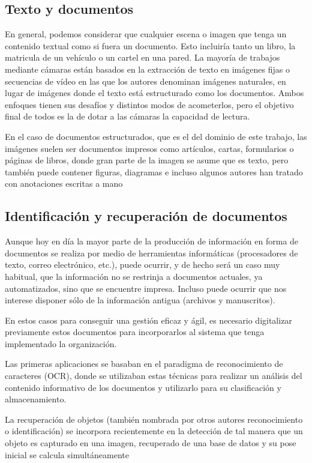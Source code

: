 \subsection{Texto y documentos}
En general, podemos considerar que cualquier escena o imagen que tenga un contenido textual como si fuera un documento. Esto incluiría tanto un libro, la matricula de un vehículo o un cartel en una pared. La mayoría de trabajos mediante cámaras están basados en la extracción de texto en imágenes fijas o secuencias de vídeo en las que los autores denominan imágenes naturales, en lugar de imágenes donde el texto está estructurado como los documentos. Ambos enfoques tienen sus desafíos y distintos modos de acometerlos, pero el objetivo final de todos es la de dotar a las cámaras la capacidad de lectura.

En el caso de documentos estructurados, que es el del dominio de este trabajo, las imágenes suelen ser documentos impresos como artículos, cartas, formularios o páginas de libros, donde gran parte de la imagen se asume que es texto, pero también puede contener figuras, diagramas e incluso algunos autores han tratado con anotaciones escritas a mano \cite{Chen}

\subsection{Identificación y recuperación de documentos}
Aunque hoy en día la mayor parte de la producción de información en forma de documentos se realiza por medio de herramientas informáticas (procesadores de texto, correo electrónico, etc.), puede ocurrir, y de hecho será un caso muy habitual, que la información no se restrinja a documentos actuales, ya automatizados, sino que se encuentre impresa. Incluso puede ocurrir que nos interese disponer sólo de la información antigua (archivos y manuscritos).

En estos casos para conseguir una gestión eficaz y ágil, es necesario digitalizar previamente estos documentos para incorporarlos al sistema que tenga implementado la organización.

Las primeras aplicaciones se basaban en el paradigma de reconocimiento de caracteres (OCR), donde se utilizaban estas técnicas para realizar un análisis del contenido informativo de los documentos y utilizarlo para su clasificación y almacenamiento. 

La recuperación de objetos (también nombrada por otros autores reconocimiento o identificación) se incorpora recientemente en la detección de tal manera que un objeto es capturado en una imagen, recuperado de una base de datos y su pose inicial se calcula simultáneamente \cite{Pilet}

